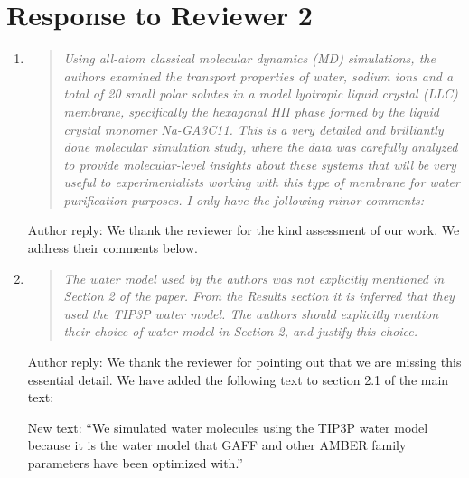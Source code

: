 \documentclass{article}
\begin{document}
\section*{Response to Reviewer 2}

\begin{enumerate}
	
	\item \begin{quote} \textit{Using all-atom classical molecular dynamics (MD) simulations,
	the authors examined the transport properties of water, sodium ions and a total of 20 
	small polar solutes in a model lyotropic liquid crystal (LLC) membrane, specifically the
	hexagonal HII phase formed by the liquid crystal monomer Na-GA3C11. This is a very 
	detailed and brilliantly done molecular simulation study, where the data was carefully 
	analyzed to provide molecular-level insights about these systems that will be very 
	useful to experimentalists working with this type of membrane for water purification 
	purposes. I only have the following minor comments: }\end{quote}
	
	Author reply: We thank the reviewer for the kind assessment of our work. We address their
	comments below.
	
	\item \begin{quote}
	
	\textit{The water model used by the authors was not explicitly mentioned in Section 2 
	of the paper. From the Results section it is inferred that they used the TIP3P water model.
	The authors should explicitly mention their choice of water model in Section 2, and 
	justify this choice.}
	
	\end{quote}
	
	Author reply: We thank the reviewer for pointing out that we are missing this essential detail.
	We have added the following text to section 2.1 of the main text:

	New text: ``We simulated water molecules using the TIP3P water model because it is
	the water model that GAFF and other AMBER family parameters have been optimized
    with.''

    

\end{enumerate}
\end{document}
